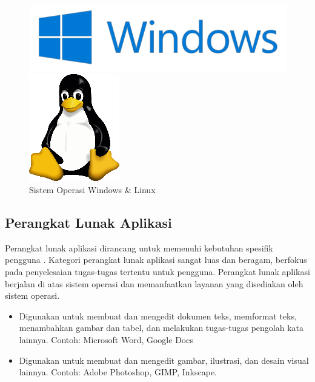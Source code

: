 \begin{figure}[!htb]
	\begin{minipage}{0.52\textwidth}
		\centering
		\includegraphics[width=0.8\linewidth]
		{assets/pics/windows.png}
	\end{minipage}\hfill
	\begin{minipage}{0.38\textwidth}
		\includegraphics[width=0.4\linewidth]
		{assets/pics/linux.png}
	\end{minipage}
	\caption{Sistem Operasi Windows \& Linux}
\end{figure}

\subsection{Perangkat Lunak Aplikasi}
Perangkat lunak aplikasi dirancang untuk memenuhi kebutuhan spesifik pengguna \cite{gee23}. Kategori perangkat lunak aplikasi sangat luas dan beragam, berfokus pada penyelesaian tugas-tugas tertentu untuk pengguna. Perangkat lunak aplikasi berjalan di atas sistem operasi dan memanfaatkan layanan yang disediakan oleh sistem operasi.

\begin{itemize}

	\item {} Digunakan untuk membuat dan mengedit dokumen teks, memformat teks, menambahkan gambar dan tabel, dan melakukan tugas-tugas pengolah kata lainnya. Contoh: Microsoft Word, Google Docs
	\item {} Digunakan untuk membuat dan mengedit gambar, ilustrasi, dan desain visual lainnya. Contoh: Adobe Photoshop, GIMP, Inkscape.

\end{itemize}

